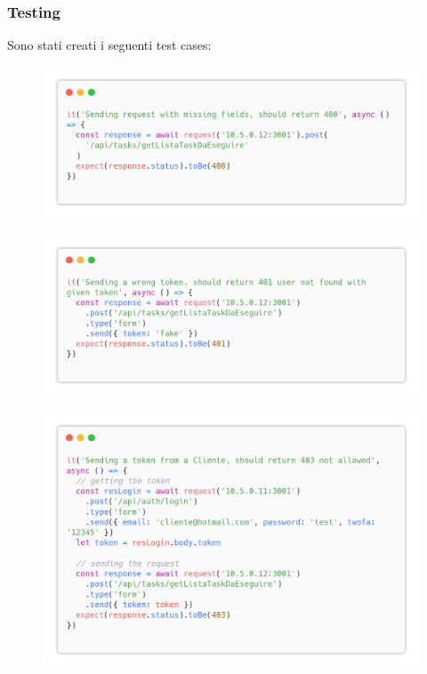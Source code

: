 \documentclass{report}
\begin{document}
\subsubsection*{Testing}

Sono stati creati i seguenti test cases:
\begin{figure}[H]
	\centering\includegraphics[width=1\textwidth]{images/code_da_eseguire_test1.png}
\end{figure}
\begin{figure}[H]
	\centering\includegraphics[width=1\textwidth]{images/code_da_eseguire_test2.png}
\end{figure}
\begin{figure}[H]
	\centering\includegraphics[width=1\textwidth]{images/code_da_eseguire_test3.png}
\end{figure}
\end{document}
